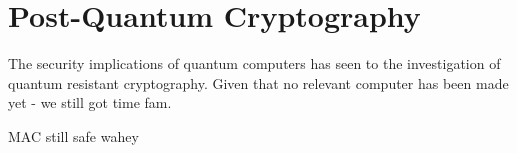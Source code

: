 \section{Post-Quantum Cryptography}
The security implications of quantum computers has seen to the investigation of quantum resistant cryptography. Given that no relevant computer
has been made yet - we still got time fam.

MAC still safe wahey







